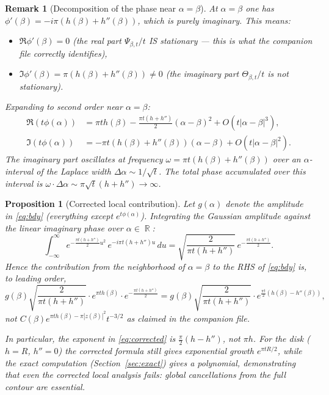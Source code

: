 \documentclass[a4paper,11pt,reqno]{amsart}
\newtheorem{proposition}{Proposition}[section]
\newtheorem{remark}{Remark}[section]
\DeclareMathOperator{\R}{\mathbb{R}}
\begin{document}
\begin{remark}[Decomposition of the phase near $\alpha=\beta$]
At $\alpha=\beta$ one has $\phi'(\beta)=-i\pi(h(\beta)+h''(\beta))$, which is
\emph{purely imaginary}. This means:
\begin{itemize}
\item $\Re\phi'(\beta)=0$ (the real part $\Psi_{\beta,t}/t$ IS stationary --- this
  is what the companion file correctly identifies),
\item $\Im\phi'(\beta)=\pi(h(\beta)+h''(\beta))\neq0$ (the imaginary part
  $\Theta_{\beta,t}/t$ is \emph{not} stationary).
\end{itemize}
Expanding to second order near $\alpha=\beta$:
\begin{align*}
\Re(t\phi(\alpha))&=\pi th(\beta)-\tfrac{\pi t(h+h'')}{2}(\alpha-\beta)^2+O(t|\alpha-\beta|^3),\\
\Im(t\phi(\alpha))&=-\pi t(h(\beta)+h''(\beta))(\alpha-\beta)+O(t|\alpha-\beta|^2).
\end{align*}
The imaginary part oscillates at frequency $\omega=\pi t(h(\beta)+h''(\beta))$
over an $\alpha$-interval of the Laplace width $\Delta\alpha\sim 1/\sqrt{t}$.
The total phase accumulated over this interval is $\omega\cdot\Delta\alpha
\sim\pi\sqrt{t}(h+h'')\to\infty$.
\end{remark}

\begin{proposition}[Corrected local contribution]
\label{prop:corrected}
Let $g(\alpha)$ denote the amplitude in \eqref{eq:bdy} (everything except
$e^{t\phi(\alpha)}$). Integrating the Gaussian amplitude against the linear
imaginary phase over $\alpha\in\R$:
\[
\int_{-\infty}^\infty e^{-\frac{\pi t(h+h'')}{2}u^2}\,e^{-i\pi t(h+h'')u}\,du
=\sqrt{\frac{2}{\pi t(h+h'')}}\,e^{-\frac{\pi t(h+h'')}{2}}.
\]
Hence the contribution from the neighborhood of $\alpha=\beta$ to the RHS
of \eqref{eq:bdy} is, to leading order,
\begin{equation}\label{eq:corrected}
g(\beta)\sqrt{\frac{2}{\pi t(h+h'')}}\cdot e^{\pi t h(\beta)}\cdot e^{-\frac{\pi t(h+h'')}{2}}
=g(\beta)\sqrt{\frac{2}{\pi t(h+h'')}}\cdot e^{\frac{\pi t}{2}(h(\beta)-h''(\beta))},
\end{equation}
\emph{not} $C(\beta)e^{\pi th(\beta)-\pi|z(\beta)|^2}t^{-3/2}$ as claimed in the
companion file.

In particular, the exponent in \eqref{eq:corrected} is $\frac\pi2(h-h'')$,
not $\pi h$. For the disk ($h=R$, $h''=0$) the corrected formula still gives
exponential growth $e^{\pi tR/2}$, while the exact computation (Section~\ref{sec:exact})
gives a polynomial, demonstrating that even the corrected local analysis
fails: global cancellations from the full contour are essential.
\end{proposition}
\end{document}
